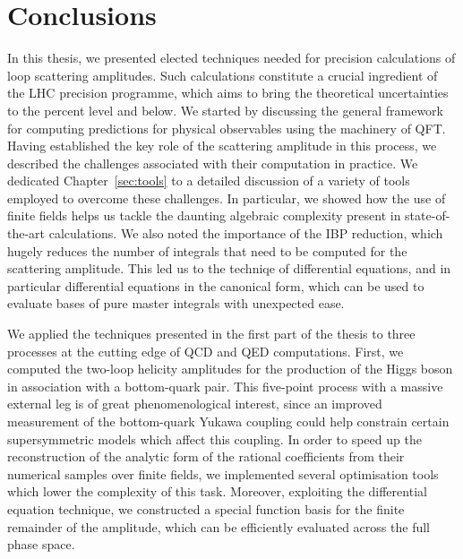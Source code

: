 \documentclass[main.tex]{subfiles}
\begin{document}
\chapter{Conclusions} \label{sec:conclusions}
In this thesis, we presented elected techniques needed for precision calculations of loop scattering amplitudes. Such calculations constitute a crucial ingredient of the LHC precision programme, which aims to bring the theoretical uncertainties to the percent level and below. We started by discussing the general framework for computing predictions for physical observables using the machinery of QFT. Having established the key role of the scattering amplitude in this process, we described the challenges associated with their computation in practice. We dedicated Chapter~\ref{sec:tools} to a detailed discussion of a variety of tools employed to overcome these challenges. In particular, we showed how the use of finite fields helps us tackle the daunting algebraic complexity present in state-of-the-art calculations. We also noted the importance of the IBP reduction, which hugely reduces the number of integrals that need to be computed for the scattering amplitude. This led us to the techniqe of differential equations, and in particular differential equations in the canonical form, which can be used to evaluate bases of pure master integrals with unexpected ease.

We applied the techniques presented in the first part of the thesis to three processes at the cutting edge of QCD and QED computations. First, we computed the two-loop helicity amplitudes for the production of the Higgs boson in association with a bottom-quark pair. This five-point process with a massive external leg is of great phenomenological interest, since an improved measurement of the bottom-quark Yukawa coupling could help constrain certain supersymmetric models which affect this coupling. In order to speed up the reconstruction of the analytic form of the rational coefficients from their numerical samples over finite fields, we implemented several optimisation tools which lower the complexity of this task. Moreover, exploiting the differential equation technique, we constructed a special function basis for the finite remainder of the amplitude, which can be efficiently evaluated across the full phase space.
\end{document}
